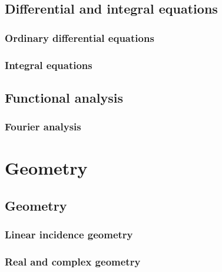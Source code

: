 \documentclass[a4paper,makeidx]{book}
\begin{document}
	
	

	\chapter{Differential and integral equations}

    \section{Ordinary differential equations}

    
    

    \section{Integral equations}

    
    
    
	
	
	

	\chapter{Functional analysis}

	\section{Fourier analysis}

	

    \part{Geometry}

    \chapter{Geometry}

	\section{Linear incidence geometry}

	

    \section{Real and complex geometry}
    
	
	

	\printindex
\end{document}
